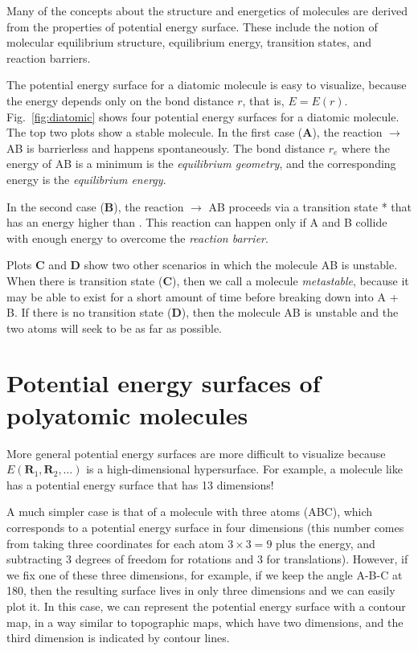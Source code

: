 \documentclass[../Main/chem371-notes.tex]{subfiles}
\begin{document}
Many of the concepts about the structure and energetics of molecules are derived from the properties of potential energy surface.
These include the notion of molecular equilibrium structure, equilibrium energy, transition states, and reaction barriers.

The potential energy surface for a diatomic molecule  is easy to visualize, because the energy depends only on the bond distance $r$, that is, $E = E(r)$.
Fig.~\ref{fig:diatomic} shows four potential energy surfaces for a diatomic molecule.
The top two plots show a stable  molecule.
In the first case (\textbf{A}), the reaction  $\rightarrow$ {AB} is barrierless and happens spontaneously.
The bond distance $r_e$ where the energy of AB is a minimum is the \emph{equilibrium geometry}, and the corresponding energy is the \emph{equilibrium energy}.

In the second case  (\textbf{B}),  the reaction  $\rightarrow$ {AB} proceeds via a transition state * that has an energy higher than .
This reaction can happen only if A and B collide with enough energy to overcome the \emph{reaction barrier}.

Plots \textbf{C} and \textbf{D} show two other scenarios in which the molecule AB is unstable.
When there is transition state (\textbf{C}), then we call a molecule \emph{metastable}, because it may be able to exist for a short amount of time before breaking down into A + B.
If there is no transition state (\textbf{D}), then the molecule AB is unstable and the two atoms will seek to be as far as possible.



\section{Potential energy surfaces of polyatomic molecules}

More general potential energy surfaces are more difficult to visualize because  $E(\mathbf{R}_1,  \mathbf{R}_2,\ldots)$ is a high-dimensional hypersurface.
For example, a molecule like  has a potential energy surface that has 13 dimensions!

A much simpler case is that of a molecule with three atoms (ABC), which corresponds to a potential energy surface in four dimensions (this number comes from taking three coordinates for each atom $3 \times 3 = 9$ plus the energy, and subtracting 3 degrees of freedom for rotations and 3 for translations).
However, if we fix one of these three dimensions, for example, if we keep the angle A-B-C at 180\textdegree, then the resulting surface lives in only three dimensions and we can easily plot it.
In this case, we can represent the potential energy surface with a contour map, in a way similar to topographic maps, which have two dimensions, and the third dimension is indicated by contour lines.
\end{document}
